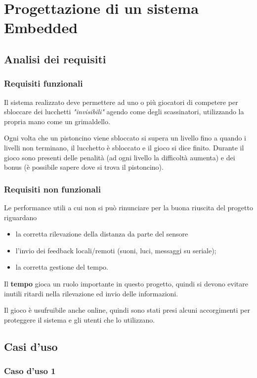 \chapter{Progettazione di un sistema Embedded}
\section{Analisi dei requisiti}
\subsection{Requisiti funzionali}
Il sistema realizzato deve permettere ad uno o più giocatori di competere per sbloccare dei lucchetti \textit{"invisibili"} agendo come degli scassinatori, utilizzando la propria mano come un grimaldello. 

Ogni volta che un pistoncino viene sbloccato si supera un livello fino a quando i livelli non terminano, il lucchetto è sbloccato e il gioco si dice finito. Durante il gioco sono presenti delle penalità (ad ogni livello la difficoltà aumenta) e dei bonus (è possibile sapere dove si trova il pistoncino).

\subsection{Requisiti non funzionali}
Le performance utili a cui non si può rinunciare per la buona riuscita del progetto  riguardano
\begin{itemize}
	\item la corretta rilevazione della distanza da parte del sensore
	\item l'invio dei feedback locali/remoti (suoni, luci, messaggi su seriale);
	\item la corretta gestione del tempo.
\end{itemize}

Il \textbf{tempo} gioca un ruolo importante in questo progetto, quindi si devono evitare inutili ritardi nella rilevazione ed invio delle informazioni.

Il gioco è usufruibile anche online, quindi sono stati presi alcuni accorgimenti per proteggere il sistema e gli utenti che lo utilizzano.

\clearpage
\section{Casi d'uso}
\subsection{Caso d'uso 1}

